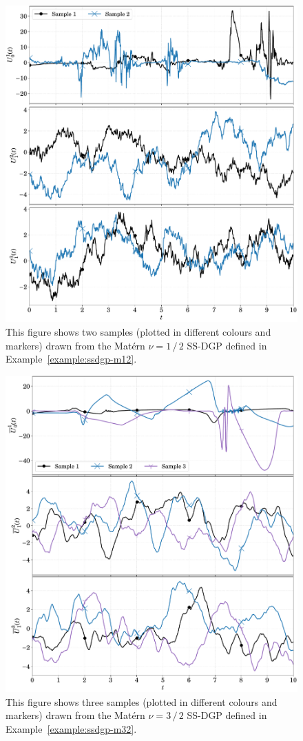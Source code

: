\begin{figure}[t!]
	\centering
	\includegraphics[width=.95\linewidth]{figs/samples_ssdgp_m12}
	\caption{This figure shows two samples (plotted in different colours and markers) drawn from the Mat\'{e}rn $\nu=1\,/\,2$ SS-DGP defined in Example~\ref{example:ssdgp-m12}.}
	\label{fig:ssdgp-m12-samples}
\end{figure}
%
\begin{figure}[t!]
	\centering
	\includegraphics[width=.95\linewidth]{figs/samples_ssdgp_m32}
	\caption{This figure shows three samples (plotted in different colours and markers) drawn from the Mat\'{e}rn $\nu=3\,/\,2$ SS-DGP defined in Example~\ref{example:ssdgp-m32}.}
	\label{fig:ssdgp-m32-samples}
\end{figure}

